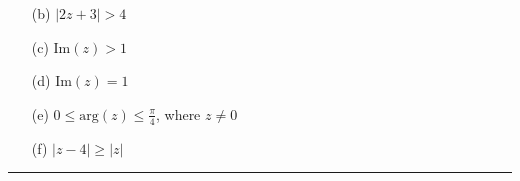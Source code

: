 \documentclass{article}
\begin{document}
\begin{enumerate}
  \item[(b)] $|2z+3| > 4$

  \item[(c)] Im$(z) > 1$

  \item[(d)] Im$(z) = 1$

  \item[(e)] $0 \le \text{arg}(z) \le \frac{\pi}{4}$, where $z \neq 0$

  \item[(f)] $|z - 4| \geq |z|$
\end{enumerate}
\vspace{1cm} %

\hrule

\end{document}
